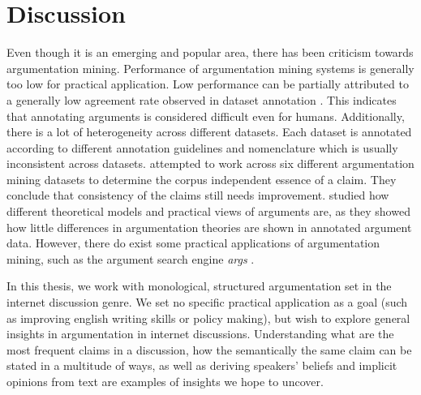 \section{Discussion}
\label{sec:area_discussion}

Even though it is an emerging and popular area, there has been criticism
towards argumentation mining.  Performance of argumentation mining systems is
generally too low for practical application. Low performance can be partially
attributed to a generally low agreement rate observed in dataset annotation
\citep{peldszus2015joint, boltuzic2017toward}. This indicates that annotating
arguments is considered difficult even for humans. Additionally, there is a lot
of heterogeneity across different datasets. Each dataset is annotated according
to different annotation guidelines and nomenclature which is usually
inconsistent across datasets.  \citet{daxenberger2017essence} attempted to work
across six different argumentation mining datasets to determine the corpus
independent essence of a claim.  They conclude that consistency of the claims
still needs improvement.  \citet{wachsmuth2017argumentation} studied how
different theoretical models and practical views of arguments are, as they
showed how little differences in argumentation theories are shown in annotated
argument data.  However, there do exist some practical applications of
argumentation mining, such as the argument search engine \emph{args}
\citep{wachsmuth2017building}.

In this thesis, we work with monological, structured argumentation set in the
internet discussion genre.  We set no specific practical application as a goal 
(such as improving english writing skills or policy making),
but wish to explore general insights in argumentation in internet discussions. 
Understanding what are the most frequent claims in a discussion, how the semantically 
the same claim can be stated in a multitude of ways,  
as well as deriving speakers' beliefs and implicit opinions from text 
are examples of insights we hope to uncover. 
